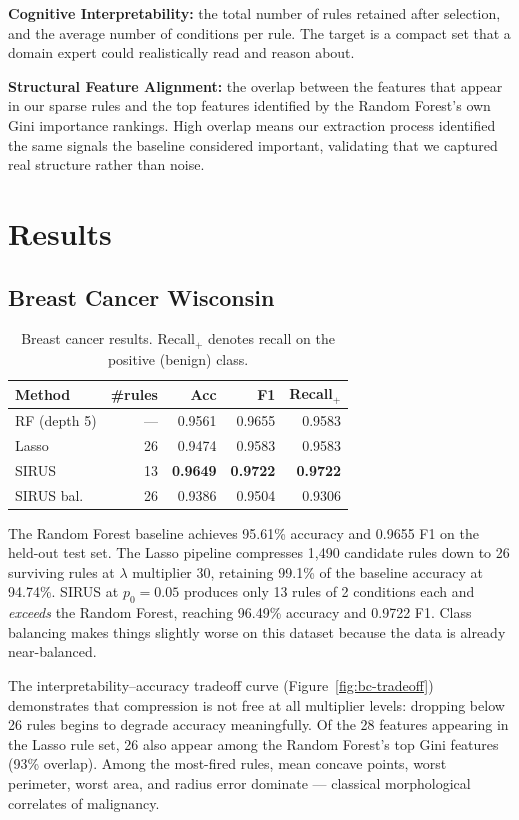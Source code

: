 \documentclass[11pt]{article}
\begin{document}
\textbf{Cognitive Interpretability:} the total number of rules retained after selection, and the average number of conditions per rule. The target is a compact set that a domain expert could realistically read and reason about.

\textbf{Structural Feature Alignment:} the overlap between the features that appear in our sparse rules and the top features identified by the Random Forest's own Gini importance rankings. High overlap means our extraction process identified the same signals the baseline considered important, validating that we captured real structure rather than noise.

\section{Results}

\subsection{Breast Cancer Wisconsin}

\begin{table}[h]
\centering
\small
\begin{tabular}{@{}lrrrr@{}}
\toprule
Method & \#rules & Acc & F1 & Recall$_+$ \\
\midrule
RF (depth 5) & --- & 0.9561 & 0.9655 & 0.9583 \\
Lasso & 26 & 0.9474 & 0.9583 & 0.9583 \\
SIRUS & 13 & \textbf{0.9649} & \textbf{0.9722} & \textbf{0.9722} \\
SIRUS bal. & 26 & 0.9386 & 0.9504 & 0.9306 \\
\bottomrule
\end{tabular}
\caption{Breast cancer results. Recall$_+$ denotes recall on the positive (benign) class.}
\label{tab:bc-results}
\end{table}

The Random Forest baseline achieves 95.61\% accuracy and 0.9655 F1 on the held-out test set. The Lasso pipeline compresses 1{,}490 candidate rules down to 26 surviving rules at $\lambda$ multiplier $30$, retaining 99.1\% of the baseline accuracy at 94.74\%. SIRUS at $p_0 = 0.05$ produces only 13 rules of 2 conditions each and \emph{exceeds} the Random Forest, reaching 96.49\% accuracy and 0.9722 F1. Class balancing makes things slightly worse on this dataset because the data is already near-balanced.

The interpretability--accuracy tradeoff curve (Figure~\ref{fig:bc-tradeoff}) demonstrates that compression is not free at all multiplier levels: dropping below 26 rules begins to degrade accuracy meaningfully. Of the 28 features appearing in the Lasso rule set, 26 also appear among the Random Forest's top Gini features (93\% overlap). Among the most-fired rules, mean concave points, worst perimeter, worst area, and radius error dominate --- classical morphological correlates of malignancy.
\end{document}
